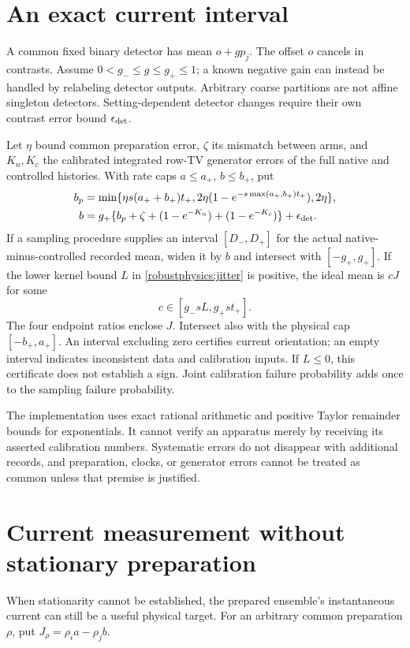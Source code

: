 \section{An exact current interval}

A common fixed binary detector has mean $o+gp_j$. The offset $o$ cancels
in contrasts. Assume $0<g_-\le g\le g_+\le1$; a known negative gain can
instead be handled by relabeling detector outputs. Arbitrary coarse partitions
are not affine singleton detectors. Setting-dependent detector changes require
their own contrast error bound $\epsilon_{\rm det}$.

Let $\eta$ bound common preparation error, $\zeta$ its mismatch between
arms, and $K_n,K_c$ the calibrated integrated row-TV generator errors of the
full native and controlled histories. With rate caps $a\le a_+$,
$b\le b_+$, put
\begin{align*}
 b_p&=\min\{\eta s(a_++b_+)t_+,
 2\eta(1-e^{-s\max(a_+,b_+)t_+}),2\eta\},\\
 b&=g_+\{b_p+\zeta+(1-e^{-K_n})+(1-e^{-K_c})\}
       +\epsilon_{\rm det}.
\end{align*}
If a sampling procedure supplies an interval $[D_-,D_+]$ for the actual
native-minus-controlled recorded mean, widen it by $b$ and intersect with
$[-g_+,g_+]$. If the lower kernel bound $L$ in
\eqref{robustphysics:jitter} is positive, the ideal mean is $cJ$ for some
\[
 c\in[g_-sL,g_+st_+].
\]
The four endpoint ratios enclose $J$. Intersect also with the physical cap
$[-b_+,a_+]$. An interval excluding zero certifies current orientation;
an empty interval indicates inconsistent data and calibration inputs. If
$L\le0$, this certificate does not establish a sign. Joint calibration
failure probability adds once to the sampling failure probability.

The implementation uses exact rational arithmetic and positive Taylor
remainder bounds for exponentials. It cannot verify an apparatus merely by
receiving its asserted calibration numbers. Systematic errors do not disappear
with additional records, and preparation, clocks, or generator errors cannot
be treated as common unless that premise is justified.

\section{Current measurement without stationary preparation}

When stationarity cannot be established, the prepared ensemble's instantaneous
current can still be a useful physical target. For an arbitrary common
preparation $\rho$, put $J_\rho=\rho_i a-\rho_j b$.

